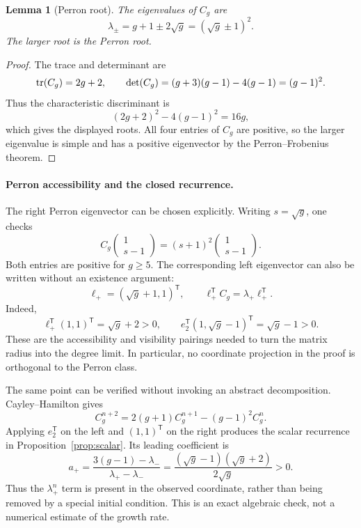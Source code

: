 \documentclass[11pt]{article}
\newtheorem{lemma}[theorem]{Lemma}
\theoremstyle{remark}
\numberwithin{equation}{section}
\begin{document}
\begin{lemma}[Perron root]\label{lem:perron}
The eigenvalues of \(C_g\) are
\[
 \lambda_\pm=g+1\pm2\sqrt g=(\sqrt g\pm1)^2.
\]
The larger root is the Perron root.
\end{lemma}

\begin{proof}
The trace and determinant are
\[
 \operatorname{tr}(C_g)=2g+2,\qquad
 \det(C_g)=(g+3)(g-1)-4(g-1)=(g-1)^2.
\]
Thus the characteristic discriminant is
\[
 (2g+2)^2-4(g-1)^2=16g,
\]
which gives the displayed roots.  All four entries of \(C_g\) are positive,
so the larger eigenvalue is simple and has a positive eigenvector by the
Perron--Frobenius theorem.
\end{proof}

\paragraph{Perron accessibility and the closed recurrence.}
The right Perron eigenvector can be chosen explicitly.  Writing
$s=\sqrt g$, one checks
\[
 C_g\begin{pmatrix}1\\s-1\end{pmatrix}
 =(s+1)^2\begin{pmatrix}1\\s-1\end{pmatrix}.
\tag{Perron vector}\label{eq:perron-vector}
\]
Both entries are positive for $g\geq5$.  The corresponding left eigenvector can
also be written without an existence argument:
\[
 \ell_+=(\sqrt g+1,1)^{\mathsf T},\qquad
 \ell_+^{\mathsf T}C_g=\lambda_+\ell_+^{\mathsf T}.
\]
Indeed,
\[
 \ell_+^{\mathsf T}(1,1)^{\mathsf T}=\sqrt g+2>0,
 \qquad
 e_2^{\mathsf T}(1,\sqrt g-1)^{\mathsf T}=\sqrt g-1>0.
\]
These are the accessibility and visibility pairings needed to turn the matrix
radius into the degree limit.  In particular, no coordinate projection in the
proof is orthogonal to the Perron class.

The same point can be verified without invoking an abstract decomposition.
Cayley--Hamilton gives
\[
 C_g^{n+2}=2(g+1)C_g^{n+1}-(g-1)^2C_g^n.
\]
Applying $e_2^{\mathsf T}$ on the left and $(1,1)^{\mathsf T}$ on the right
produces the scalar recurrence in Proposition~\ref{prop:scalar}.  Its leading
coefficient is
\[
 a_+=\frac{3(g-1)-\lambda_-}{\lambda_+-\lambda_-}
 =\frac{(\sqrt g-1)(\sqrt g+2)}{2\sqrt g}>0.
\tag{Perron coefficient}\label{eq:perron-coefficient}
\]
Thus the $\lambda_+^n$ term is present in the observed coordinate, rather than
being removed by a special initial condition.  This is an exact algebraic
check, not a numerical estimate of the growth rate.
\end{document}
